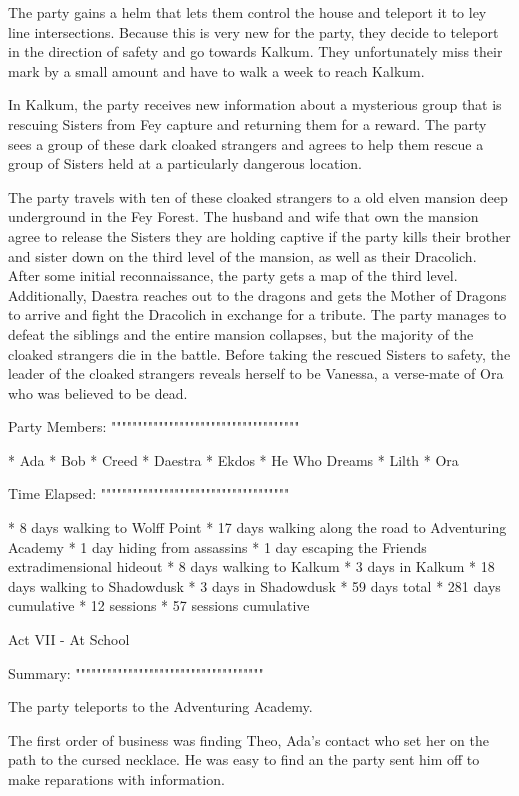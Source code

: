 The party gains a helm that lets them control the house and teleport it to ley line intersections.
Because this is very new for the party, they decide to teleport in the direction of safety and go towards Kalkum.
They unfortunately miss their mark by a small amount and have to walk a week to reach Kalkum.

In Kalkum, the party receives new information about a mysterious group that is rescuing Sisters from Fey capture and returning them for a reward.
The party sees a group of these dark cloaked strangers and agrees to help them rescue a group of Sisters held at a particularly dangerous location.

The party travels with ten of these cloaked strangers to a old elven mansion deep underground in the Fey Forest.
The husband and wife that own the mansion agree to release the Sisters they are holding captive if the party kills their brother and sister down on the third level of the mansion, as well as their Dracolich.
After some initial reconnaissance, the party gets a map of the third level.
Additionally, Daestra reaches out to the dragons and gets the Mother of Dragons to arrive and fight the Dracolich in exchange for a tribute.
The party manages to defeat the siblings and the entire mansion collapses, but the majority of the cloaked strangers die in the battle.
Before taking the rescued Sisters to safety, the leader of the cloaked strangers reveals herself to be Vanessa, a verse-mate of Ora who was believed to be dead.

Party Members:
""""""""""""""""""""""""""""""""""""

  * Ada
  * Bob
  * Creed
  * Daestra
  * Ekdos
  * He Who Dreams
  * Lilth
  * Ora

Time Elapsed:
""""""""""""""""""""""""""""""""""""

  * 8 days walking to Wolff Point
  * 17 days walking along the road to Adventuring Academy
  * 1 day hiding from assassins
  * 1 day escaping the Friends extradimensional hideout
  * 8 days walking to Kalkum
  * 3 days in Kalkum
  * 18 days walking to Shadowdusk
  * 3 days in Shadowdusk
  * 59 days total
  * 281 days cumulative
  * 12 sessions
  * 57 sessions cumulative

Act VII - At School
^^^^^^^^^^^^^^^^^^^^^^^^^^^^^^^^^^^^

Summary:
""""""""""""""""""""""""""""""""""""

The party teleports to the Adventuring Academy.

The first order of business was finding Theo, Ada's contact who set her on the path to the cursed necklace.
He was easy to find an the party sent him off to make reparations with information.

